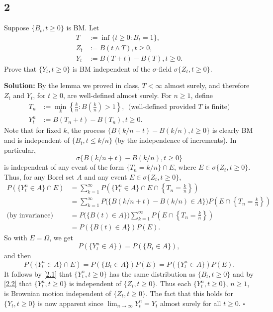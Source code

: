 \documentclass[12pt]{article}
\newcounter{ProofCounter}
\newenvironment{Solution}{\stepcounter{ProofCounter}\textbf{Solution:}}{\hfill$\square$}
\begin{document}
\subsection*{2}
\begin{tcolorbox}
  Suppose $\{B_t, t \geq 0\}$ is BM. Let 
  \begin{align*}
    T & := \inf\{t \geq 0 : B_t = 1\}, \\
    Z_t & := B(t \wedge T), t \geq 0, \\
    Y_t & := B(T + t) - B(T), t \geq 0.
  \end{align*}
  Prove that $\{ Y_t, t \geq 0\}$ is BM independent of the $\sigma$-field $\sigma\{ Z_t, t \geq 0\}$.
\end{tcolorbox}
\begin{Solution}
  By the lemma we proved in class, $T < \infty$ almost surely, and therefore $Z_t$ and $Y_t$, for $t \geq 0$, are well-defined almost surely. For $n \geq 1$, define
  \begin{align*}
    T_n & := \min_{k} \left\{ \frac{k}{n} : B\left( \frac{k}{n} \right) > 1 \right\}, \ \ \text{(well-defined provided $T$ is finite)} \\
    Y_{t}^n & := B(T_n + t) - B(T_n), t \geq 0.
  \end{align*}
  Note that for fixed $k$, the process $\{B(k/n + t) - B(k/n), t \geq 0 \}$ is clearly BM and is independent of $\{ B_t, t  \leq k/n \}$ (by the independence of increments). In particular,
  \[
    \sigma\{B(k/n + t) - B(k/n), t \geq 0\}
  \]
  is independent of any event of the form $\{ T_n = k/n \} \cap E$, where $E \in \sigma\{Z_t, t \geq 0\}$.
  Thus, for any Borel set $A$ and any event $E \in \sigma\{Z_t, t \geq 0\}$,
  \begin{align*}
    P(\{Y_t^n \in A\} \cap E) & = \sum_{k=1}^{\infty} P\left(\{Y_t^n \in A\} \cap E \cap \left\{T_n = \frac{k}{n}\right\}\right) \\
    & = \sum_{k=1}^{\infty} P\bigg( \{B(k/n + t) - B(k/n) \in A\}\bigg)P\left(E \cap \left\{T_n = \frac{k}{n}\right\} \right) \\
    \text{(by invariance)} \ \ \ & = P\bigg( \{B(t) \in A\}\bigg)\sum_{k=1}^{\infty} P\left(E \cap \left\{T_n = \frac{k}{n}\right\} \right) \\
    & = P( \{B(t) \in A\})P(E).
  \end{align*}
  So with $E = \Omega$, we get
  \begin{equation}
    P(\{Y_t^n \in A\}) = P(\{B_t \in A\}),
    \label{2.1}
  \end{equation}
  and then
  \begin{equation}
    P(\{Y_t^n \in A\} \cap E) = P(\{B_t \in A\})P(E) = P(\{Y_t^n \in A\})P(E).
    \label{2.2}
  \end{equation}
  It follows by \eqref{2.1} that $\{ Y_t^n, t \geq 0\}$ has the same distribution as $\{ B_t, t \geq 0\}$ and by \eqref{2.2} that $\{ Y_t^n, t \geq 0\}$ is independent of $\{ Z_t, t \geq 0\}$.
  Thus each $\{ Y_t^n, t \geq 0\}$, $n \geq 1$, is Brownian motion independent of $\{Z_t, t \geq 0\}$. The fact that this holds for $\{ Y_t, t \geq 0\}$ is now apparent since
  $\lim_{n\rightarrow \infty} Y_t^n = Y_t$ almost surely for all $t \geq 0$.
\end{Solution}
\end{document}
